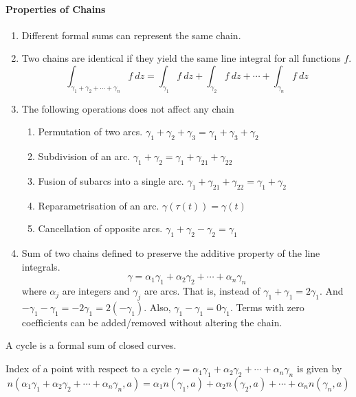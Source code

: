 \paragraph{Properties of Chains}
\begin{enumerate}
	\item Different formal sums can represent the same chain.
	\item Two chains are identical if they yield the same line integral for all functions $f$.
		\[ \int_{\gamma_1+\gamma_2+\dotsb+\gamma_n} f\ dz = \int_{\gamma_1} f\ dz + \int_{\gamma_2} f\ dz + \dotsb + \int_{\gamma_n} f\ dz \]
	\item The following operations does not affect any chain
	\begin{enumerate}
		\item Permutation of two arcs. $\gamma_1+\gamma_2+\gamma_3 = \gamma_1+\gamma_3+\gamma_2$
		\item Subdivision of an arc. $\gamma_1+\gamma_2 = \gamma_1 + \gamma_{21} + \gamma_{22}$
		\item Fusion of subarcs into a single arc. $\gamma_1 + \gamma_{21}+\gamma_{22} = \gamma_1+\gamma_2$
		\item Reparametrisation of an arc. $\gamma(\tau(t)) = \gamma(t)$
		\item Cancellation of opposite arcs. $\gamma_1 + \gamma_2 - \gamma_2 = \gamma_1$
	\end{enumerate}
	\item Sum of two chains defined to preserve the additive property of the line integrals.
		\[ \gamma = \alpha_1 \gamma_1 + \alpha_2 \gamma_2 + \dotsb + \alpha_n \gamma_n \]
		where $\alpha_j$ are integers and $\gamma_j$ are arcs.
		That is, instead of $\gamma_1 + \gamma_1 = 2\gamma_1$.
		And $-\gamma_1-\gamma_1 = -2\gamma_1 = 2(-\gamma_1)$.
		Also, $\gamma_1 - \gamma_1 = 0 \gamma_1$.
		Terms with zero coefficients can be added/removed without altering the chain.
\end{enumerate}
\begin{definition}[cycle]
	A cycle is a formal sum of closed curves.
\end{definition}
\begin{definition}
	Index of a point with respect to a cycle $\gamma = \alpha_1\gamma_1+\alpha_2\gamma_2+\dotsb+\alpha_n\gamma_n$ is given by
	\begin{equation}
		n(\alpha_1\gamma_1+\alpha_2\gamma_2+\dotsb+\alpha_n\gamma_n,a) = \alpha_1n(\gamma_1,a) + \alpha_2n(\gamma_2,a)+\dotsb + \alpha_nn(\gamma_n,a)
	\end{equation}
\end{definition}

